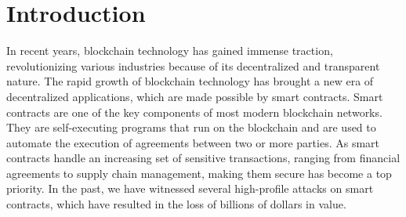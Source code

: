 
\chapter{Introduction}\label{chapter:introduction}
In recent years, blockchain technology has gained immense traction, revolutionizing various industries because of its decentralized and transparent nature.
The rapid growth of blockchain technology has brought a new era of decentralized applications, which are made possible by smart contracts.
Smart contracts are one of the key components of most modern blockchain networks.
They are self-executing programs that run on the blockchain and are used to automate the execution of agreements between two or more parties.
As smart contracts handle an increasing set of sensitive transactions, ranging from financial agreements to supply chain management, making them secure has become a top priority.
In the past, we have witnessed several high-profile attacks on smart contracts, which have resulted in the loss of billions of dollars in value.


